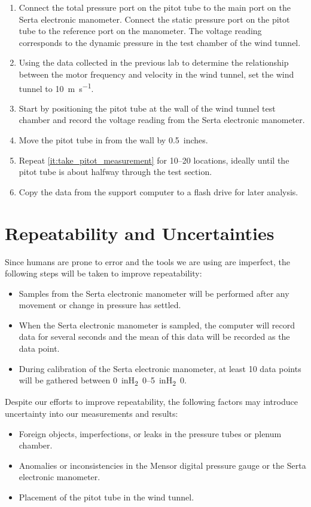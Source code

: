 \begin{enumerate}
    \item Connect the total pressure port on the pitot tube to the main port on the Serta electronic manometer. Connect the static pressure port on the pitot tube to the reference port on the manometer. The voltage reading corresponds to the dynamic pressure in the test chamber of the wind tunnel.
    \item Using the data collected in the previous lab to determine the relationship between the motor frequency and velocity in the wind tunnel, set the wind tunnel to \qty{10}{\meter\per\second}.
    \item Start by positioning the pitot tube at the wall of the wind tunnel test chamber and record the voltage reading from the Serta electronic manometer.
    \item Move the pitot tube in from the wall by \qty{0.5}{inches}. \label{it:take_pitot_measurement}
    \item Repeat \autoref{it:take_pitot_measurement} for \numrange{10}{20} locations, ideally until the pitot tube is about halfway through the test section.
    \item Copy the data from the support computer to a flash drive for later analysis.
\end{enumerate}

\section{Repeatability and Uncertainties}

Since humans are prone to error and the tools we are using are imperfect, the following steps will be taken to improve repeatability:

\begin{itemize}
    \item Samples from the Serta electronic manometer will be performed after any movement or change in pressure has settled.
    \item When the Serta electronic manometer is sampled, the computer will record data for several seconds and the mean of this data will be recorded as the data point.
    \item During calibration of the Serta electronic manometer, at least \num{10} data points will be gathered between \qtyrange{0}{5}{inH_20}.
\end{itemize}

Despite our efforts to improve repeatability, the following factors may introduce uncertainty into our measurements and results:

\begin{itemize}
    \item Foreign objects, imperfections, or leaks in the pressure tubes or plenum chamber.
    \item Anomalies or inconsistencies in the Mensor digital pressure gauge or the Serta electronic manometer.
    \item Placement of the pitot tube in the wind tunnel.
\end{itemize}
